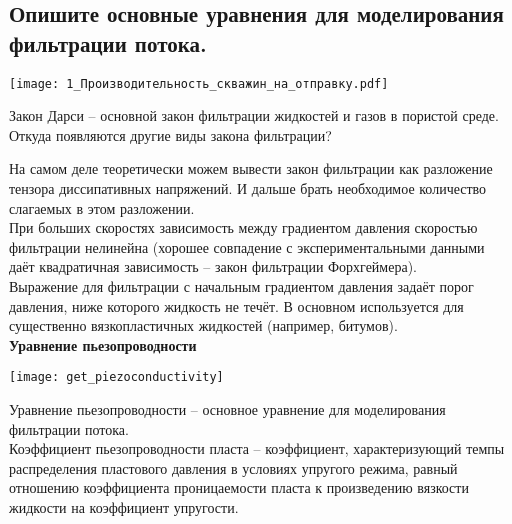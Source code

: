 

\subsection{Опишите основные уравнения для моделирования фильтрации потока.}

\texttt{[image: 1\_Производительность\_скважин\_на\_отправку.pdf]}

Закон Дарси -- основной закон фильтрации жидкостей и газов в пористой среде.
\\

Откуда появляются другие виды закона фильтрации?

На самом деле теоретически можем вывести закон фильтрации как разложение тензора диссипативных напряжений.
И дальше брать необходимое количество слагаемых в этом разложении.
\\

При больших скоростях зависимость между градиентом давления скоростью фильтрации нелинейна (хорошее совпадение с экспериментальными данными даёт квадратичная зависимость -- закон фильтрации Форхгеймера).
\\

Выражение для фильтрации с начальным градиентом давления задаёт порог давления, ниже которого жидкость не течёт.
В основном используется для существенно вязкопластичных жидкостей (например, битумов).
\\

\textbf{Уравнение пьезопроводности}

\texttt{[image: get\_piezoconductivity]}

Уравнение пьезопроводности -- основное уравнение для моделирования фильтрации потока.
\\

Коэффициент пьезопроводности пласта -- коэффициент, характеризующий темпы распределения пластового давления в условиях упругого режима, равный отношению коэффициента проницаемости пласта к произведению вязкости жидкости на коэффициент упругости.

